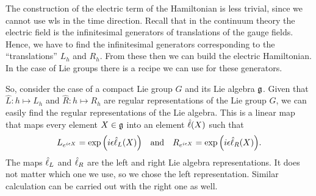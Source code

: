 The construction of the electric term of the Hamiltonian is less trivial, since we cannot use \ac{wl}s in the time direction.
Recall that in the continuum theory the electric field is the infinitesimal generators of translations of the gauge fields.
Hence, we have to find the infinitesimal generators corresponding to the ``translations'' $L_h$ and $R_h$.
From these then we can build the electric Hamiltonian.
In the case of Lie groups there is a recipe we can use for these generators.

So, consider the case of a compact Lie group $G$ and its Lie algebra $\mathfrak{g}$.
Given that $\hat{L}: h \mapsto L_h$ and $\hat{R}: h \mapsto R_h$ are regular representations of the Lie group $G$, we can easily find the regular representations of the Lie algebra.
This is a linear map that maps every element $X \in \mathfrak{g}$ into an element $\hat{\ell}(X)$ such that
\begin{equation}
    L_{e^{i \epsilon X}} = \exp \qty(i \epsilon \generator_L(X))
    \qand
    R_{e^{i \epsilon X}} = \exp \qty(i \epsilon \generator_R(X)).
\end{equation}
The maps $\hat{\ell}_L$ and $\hat{\ell}_R$ are the left and right Lie algebra representations.
It does not matter which one we use, so we chose the left representation.
Similar calculation can be carried out with the right one as well.

